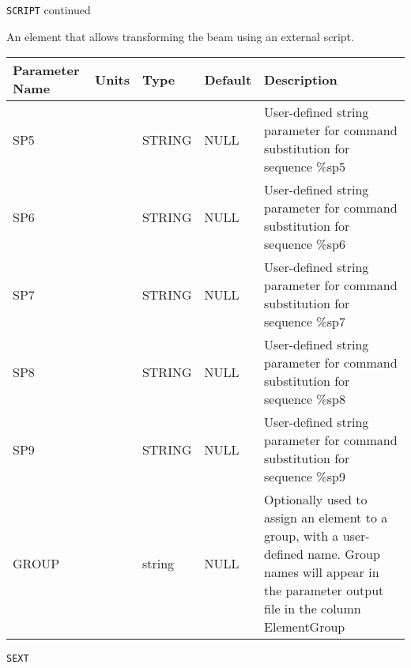\newpage
\begin{center}{\Large\verb|SCRIPT| continued}\end{center}
An element that allows transforming the beam using an external script.
\\
\begin{tabular}{|l|l|l|l|p{\descwidth}|} \hline
Parameter Name & Units & Type & Default & Description \\ \hline 
SP5 &  & STRING &   NULL            & User-defined string parameter for command substitution for sequence \%sp5  \\ \hline 
SP6 &  & STRING &   NULL            & User-defined string parameter for command substitution for sequence \%sp6  \\ \hline 
SP7 &  & STRING &   NULL            & User-defined string parameter for command substitution for sequence \%sp7  \\ \hline 
SP8 &  & STRING &   NULL            & User-defined string parameter for command substitution for sequence \%sp8  \\ \hline 
SP9 &  & STRING &   NULL            & User-defined string parameter for command substitution for sequence \%sp9  \\ \hline 
GROUP &  & string & NULL & Optionally used to assign an element to a group, with a user-defined name.  Group names will appear in the parameter output file in the column ElementGroup  \\ \hline 
\end{tabular}

\vspace*{0.5in}

\newpage
\begin{center}{\Large\verb|SEXT|}\end{center}
